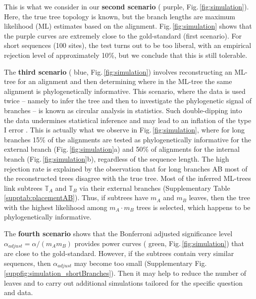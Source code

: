 \medskip

This is what we consider in our \textbf{second scenario}  ({\color{truetreeML} purple}, Fig.\,\ref{fig:simulation}). Here, the true tree topology is known, but the branch lengths are maximum likelihood (ML) estimates based on the alignment. Fig.\,\ref{fig:simulation} shows that the purple curves are extremely close to the gold-standard (first scenario). For short sequences (100 sites), the test turns out to be too liberal, with an empirical rejection level of approximately 10\%, but we conclude that this is still tolerable.


\medskip


The \textbf{third scenario} ({\color{MLtree} blue}, Fig.\,\ref{fig:simulation}) involves reconstructing an ML-tree for an alignment and then determining where in the ML-tree the same alignment is phylogenetically informative. This scenario, where the data is used twice -- namely to infer the tree and then to investigate the phylogenetic signal of branches -- is known as circular analysis in statistics. Such double-dipping into the data undermines statistical inference and may lead to an inflation of the type I error . This is actually what we observe in Fig.\,\ref{fig:simulation}, where for long branches 15\% of the alignments are tested as phylogenetically informative for the external branch (Fig.\,\ref{fig:simulation}a) and 50\% of alignments for the internal branch (Fig.\,\ref{fig:simulation}b), regardless of the sequence length. The high rejection rate is explained by the observation that for long branches AB most of the reconstructed trees disagree with the true tree. Most of the inferred ML-trees link subtrees $\mathbb{T}_A$ and $\mathbb{T}_B$  via their external branches (Supplementary Table \ref{supptab:placementAB}). Thus, if subtrees have $m_A$ and $m_B$ leaves, then the tree with the highest likelihood among $m_A\cdot m_B$ trees is selected, which happens to be phylogenetically informative.

\medskip

The \textbf{fourth scenario} shows that the Bonferroni adjusted significance level $\alpha_{adjust} = \alpha / (m_A m_B)$ provides power curves ({\color{MLtreeBonferroni} green}, Fig.\,\ref{fig:simulation}) that are close to the gold-standard. However, if the subtrees contain very similar sequences, then $\alpha_{adjust}$ may become too small (Supplementary Fig.\,\ref{suppfig:simulation_shortBranches}). Then it may help to reduce the number of leaves and to carry out additional simulations tailored for the specific question and data.

